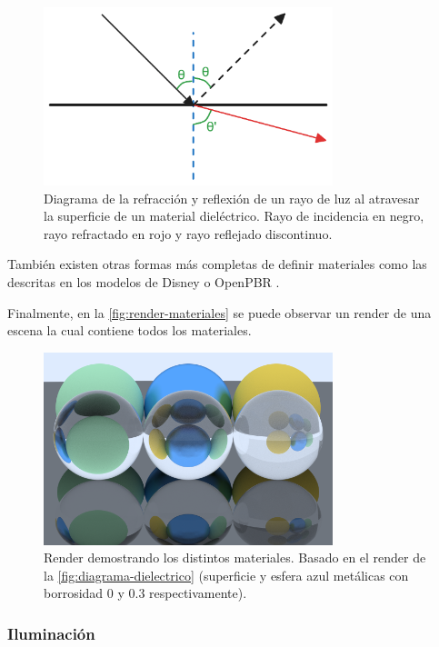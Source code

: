 \documentclass[10pt, a4paper]{article}
\begin{document}
\begin{figure}[H]
    \centering
    \includegraphics[width=0.75\textwidth]{dielectric}
    \caption{Diagrama de la refracción y reflexión de un rayo de luz al atravesar la superficie de un material dieléctrico. Rayo de incidencia en negro, rayo refractado en rojo y rayo reflejado discontinuo.}
    \label{fig:diagrama-dielectrico}
\end{figure}

También existen otras formas más completas de definir materiales como las descritas en los modelos de Disney \cite{Burley:2012} o OpenPBR \cite{Academy-Software-Foundation:2024}.

Finalmente, en la \autoref{fig:render-materiales} se puede observar un render de una escena la cual contiene todos los materiales.

\begin{figure}[H]
    \centering 
    \includegraphics[width=0.75\textwidth]{01_materials}
    \caption{Render demostrando los distintos materiales. Basado en el render de la \autoref{fig:diagrama-dielectrico} (superficie y esfera azul metálicas con borrosidad 0 y 0.3 respectivamente).}
    \label{fig:render-materiales}
\end{figure}

\subsubsection{Iluminación}
\end{document}
